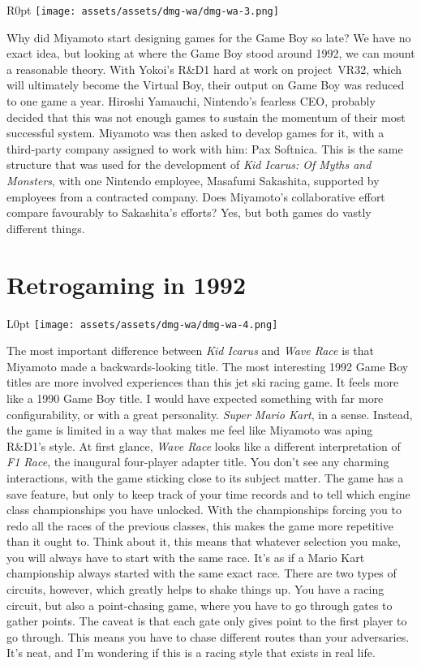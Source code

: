 \documentclass{book}
\begin{document}
\begin{wrapfigure}{R}{0pt} \texttt{[image: assets/assets/dmg-wa/dmg-wa-3.png]}\end{wrapfigure}
Why did Miyamoto start designing games for the Game Boy so late? We have no exact idea, but looking at where the Game Boy stood around 1992, we can mount a reasonable theory. With Yokoi’s R\&D1 hard at work on project VR32, which will ultimately become the Virtual Boy, their output on Game Boy was reduced to one game a year. Hiroshi Yamauchi, Nintendo’s fearless CEO, probably decided that this was not enough games to sustain the momentum of their most successful system. Miyamoto was then asked to develop games for it, with a third-party company assigned to work with him: Pax Softnica. This is the same structure that was used for the development of \emph{Kid Icarus: Of Myths and Monsters}, with one Nintendo employee, Masafumi Sakashita, supported by employees from a contracted company. Does Miyamoto’s collaborative effort compare favourably to Sakashita’s efforts? Yes, but both games do vastly different things.

\FloatBarrier\needspace{10mm}\section*{Retrogaming in 1992}\nopagebreak[4]

\begin{wrapfigure}{L}{0pt} \texttt{[image: assets/assets/dmg-wa/dmg-wa-4.png]}\end{wrapfigure}
The most important difference between \emph{Kid Icarus} and \emph{Wave Race} is that Miyamoto made a backwards-looking title. The most interesting 1992 Game Boy titles are more involved experiences than this jet ski racing game. It feels more like a 1990 Game Boy title. I would have expected something with far more configurability, or with a great personality. \emph{Super Mario Kart}, in a sense. Instead, the game is limited in a way that makes me feel like Miyamoto was aping R\&D1’s style. At first glance, \emph{Wave Race} looks like a different interpretation of \emph{F1 Race}, the inaugural four-player adapter title. You don’t see any charming interactions, with the game sticking close to its subject matter. The game has a save feature, but only to keep track of your time records and to tell which engine class championships you have unlocked. With the championships forcing you to redo all the races of the previous classes, this makes the game more repetitive than it ought to. Think about it, this means that whatever selection you make, you will always have to start with the same race. It’s as if a Mario Kart championship always started with the same exact race. There are two types of circuits, however, which greatly helps to shake things up. You have a racing circuit, but also a point-chasing game, where you have to go through gates to gather points. The caveat is that each gate only gives point to the first player to go through. This means you have to chase different routes than your adversaries. It’s neat, and I’m wondering if this is a racing style that exists in real life.
\end{document}
